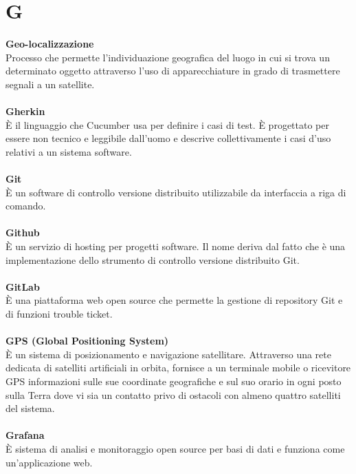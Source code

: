 \section{G}
\textbf{Geo-localizzazione}\\
Processo che permette l'individuazione geografica del luogo in cui si trova un determinato oggetto attraverso l'uso di apparecchiature in grado di trasmettere segnali a un satellite. \\ \\
\textbf{Gherkin}\\
È il linguaggio che Cucumber usa per definire i casi di test. È progettato per essere non tecnico e leggibile dall'uomo e descrive collettivamente i casi d'uso relativi a un sistema software. \\ \\
\textbf{Git}\\
È un software di controllo versione distribuito utilizzabile da interfaccia a riga di comando. \\ \\
\textbf{Github}\\
È un servizio di hosting per progetti software. Il nome deriva dal fatto che è una implementazione dello strumento di controllo versione distribuito Git. \\ \\
\textbf{GitLab}\\
È una piattaforma web open source che permette la gestione di repository Git e di funzioni trouble ticket. \\ \\
\textbf{GPS (Global Positioning System)}\\
È un sistema di posizionamento e navigazione satellitare. Attraverso una rete dedicata di satelliti artificiali in orbita, fornisce a un terminale mobile o ricevitore GPS informazioni sulle sue coordinate geografiche e sul suo orario in ogni posto sulla Terra dove vi sia un contatto privo di ostacoli con almeno quattro satelliti del sistema. \\ \\
\textbf{Grafana}\\
È sistema di analisi e monitoraggio open source per basi di dati e funziona come un'applicazione web. \\ \\
\clearpage